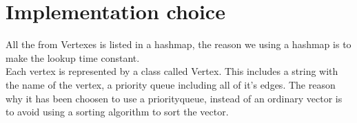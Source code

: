 \documentclass[10pt,a4paper]{article}
\begin{document}
\section{Implementation choice}
All the from Vertexes is listed in a hashmap, the reason we using a hashmap is to make the lookup time constant. \\
Each vertex is represented by a class called Vertex. This includes a string with the name of the vertex, a priority queue  including all of it's edges.  The reason why it has been choosen to use a priorityqueue, instead of an ordinary vector  is to avoid using a sorting algorithm to sort the vector.

 
\end{document}
